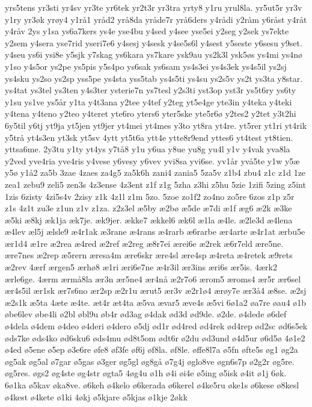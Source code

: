 {yrs5tens
yr3sti
yr4sv
yr3te
yr6tek
yr2t3r
yr3tra
yrty8
y1ru
yrul8la.
yr5ut5r
yr3v
y1ry
yr3øk
yrøy4
y1rå1
yråd2
yrå8da
yråde7r
yrå6ders
y4rådi
y2råm
y6råst
y4råt
y4råv
2ys
y1sa
ys6a7kers
ys4e
yse4bu
y4sed
y4see
yse5ei
y2seg
y2sek
ys7ekte
y2sem
y4sera
yse7rid
yseri7e6
y4sesj
y4sesk
y4se5s6l
y4sest
y5seste
y6sesu
y9set.
y4seu
ys6i
ysi8e
y5sjk
y7skag
ys6kara
ys7kare
ysk9au
ys2k3l
ysk5øs
ys4mi
ys4nø
y1so
y4s5or
ys2pe
ys5pis
y5s4po
ys6sak
ys6sam
ys4s3ei
ys4s3ek
ys4s5il
ys2sj
ys4sku
ys2so
ys2sp
yss5pe
ys4sta
yss5tab
ys4s5ti
ys4su
ys2s5v
ys2t
ys3ta
y8star.
ys4tat
ys3tel
ys3ten
y4s3ter
ysterie7n
ys7tesl
y2s3ti
yst3op
yst3r
ys5t6ry
ys6ty
y1su
ys1ve
ys5år
y1ta
y4t3ana
y2tee
y4tef
y2teg
yt5e4ge
yte3in
y4teka
y4teki
y4tena
y4teno
y2teo
y4teret
yte6ro
yters6
yter5ske
yte5r6ø
y2tes2
y2tet
y3t2hi
6y5til
y6tj
yt9ja
yt5jen
yt9jer
yt4mei
yt4mes
y3to
yt8ra
yt4re.
yt5rer
yt1ri
yt4rik
y5trå
yt4s3en
yt3sk
yt5sv
4ytt
yt5t6a
ytt4e
ytte8r9end
yttes6
yt4test
yt8tien.
yttsa6me.
2y3tu
y1ty
yt4ys
y7tå8
y1u
y6ua
y8ue
yu8g
yu4l
y1v
y4vak
yva8la
y2ved
yve4ria
yve4ris
y4vese
y6vesy
y6vev
yvi8sa
yvi6se.
yv1år
yvå5te
y1w
y5æ
y5ø
y1å2
za5b
3zae
4zaes
za4g5
za5k6h
zani4
zania5
5za5v
z1b4
zbu4
z1c
z1d
1ze
zea1
zebu9
zeli5
zen3s
4z3ense
4z3ent
z1f
z1g
5zha
z3hi
z5hu
5zie
1zifi
5zing
z5int
1zis
6zisty
4zi5s4v
2zisy
z1k
4z1l
z1m
5zo.
5zoe
zo1f2
zo4no
zo5re
6zos
z1p
z5r
z1s
4z1t
zu3e
z1un
z1v
z1za.
z2z3el
æ5by
æ2bø
æ5de
æ7di
æ1f
æg6
æ2k
æ3ke
æ5ki
æ8kj
æk1ja
æk7je.
æk9jer.
ække7
ækkel6
æk6l
æ1la
æ4le.
æ2le3d
æ4lena
æ4lev
æl5j
ælsle9
æ4r1ak
æ3rane
æ4rans
æ4rarb
æ6rarbe
ær4arte
æ4r1at
ærbu5e
ær1d4
æ1re
æ2rea
æ4red
æ2ref
æ2reg
æ8r7ei
ærei6e
æ2rek
æ6r7eld
ære5ne.
ære7nes
æ2rep
æ5rern
æresa4m
ære6skr
ære4sl
ære4sp
æ4reta
æ4retek
æ9rets
æ2rev
4ærf
ærgen5
ærhø8
æ1ri
æri6e7ne
æ4r3il
ær3ins
æri6s
ær5is.
4ærk2
ærle6ge.
4ærm
ærmå8la
ær3n
ær5ne4
ær4nå
æ2r7o6
ærom5
æroms4
ær5r
ær6sel
ær4s5il
ær1sk
ær7s6no
ær2sp
æ2r1u
ærut5
ær3v
æ2r1ø4
ærøy7e
ær3å4
æ8se.
æ2sj
æ2s1k
æ5ta
4æte
æ4te.
æt4r
æt4ta
æ5va
ævar5
æve4s
æ5vi
6ø1a2
øa7re
øau4
ø1b
øbe6lev
øbe4li
ø2bl
øbl9u
øb4r
ød3ag
ø4dak
ød3d
ød9de.
ø2de.
ø4dede
ø6def
ø4dela
ø4dem
ø4deo
ø4deri
ø4dero
ø5dj
ød1r
ød4red
ød4rek
ød4rep
ød2sc
ød6s5ek
øds7ke
øds4ko
ød6sku6
øds4mu
ød8t5om
ødt6r
ø2du
ød3und
ø4d5ur
ø6d5ø
4ø1e2
ø4ed
ø5ene
ø5ep
ø3e6re
øfe8
øf3fe
øf6j
øf8la.
øf8le.
øffe8l7a
ø5fn
øfte5s
øg1
øg2a
øg5ak
øg5al
ø7gar
ø5gas
ø3ger
øg5gl
øg8gå
ø7g4j
øglo8ve
øgn6s7p
ø2g2r
øg5re.
øg5res.
øgs2
øg4ste
øg4str
øgta5
4øg4u
ø1h
ø4i
øi4e
ø5ing
ø5isk
ø4it
ø1j
6øk.
6ø1ka
ø5kav
øka8ve.
ø6keh
ø4kelo
ø6kerada
ø6kerel
ø4ke5ru
øke1s
ø6kese
ø8kesl
ø4kest
ø4kete
ø1ki
4økj
ø5kjare
ø5kjas
ø1kje
2økk
}
